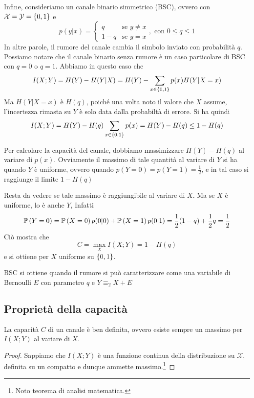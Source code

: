 \begin{example}{}
  Infine, consideriamo un canale binario simmetrico (BSC), ovvero con \(\mathcal{X} = \mathcal{Y} = \set{0,1}\) e 
  \[p(y|x) = \begin{cases}
    q & \text{se } y\neq x \\
    1-q & \text{se } y = x
  \end{cases}, \text{ con } 0\leq q \leq 1\]
  In altre parole, il rumore del canale cambia il simbolo inviato con probabilità \(q\).
  Possiamo notare che il canale binario senza rumore è un caso particolare di BSC con \(q=0\) o \(q=1\).
  Abbiamo in questo caso che
  \[I(X;Y) = H(Y) - H(Y|X) = H(Y) - \sum_{x\in\set{0,1}} p(x) H(Y|X=x)\]
  Ma \(H(Y|X=x)\) è \(H(q)\), poiché una volta noto il valore che \(X\) assume, l'incertezza rimasta su \(Y\) è solo data dalla probabiltà di errore. Si ha quindi
  \[ I(X;Y)=H(Y)-H(q)\sum_{x\in\set{0,1}} p(x) = H(Y) - H(q)\leq 1- H(q)\]

  Per calcolare la capacità del canale, dobbiamo massimizzare \(H(Y)-H(q)\) al variare di \(p(x)\).
  Ovviamente il massimo di tale quantità al variare di \(Y\) si ha quando \(Y\) è uniforme, ovvero quando \(p(Y=0) = p(Y=1) = \frac{1}{2}\), e in tal caso si raggiunge il limite \(1-H(q)\)

  Resta da vedere se tale massimo è raggiungibile al variare di \(X\).
  Ma se \(X\) è uniforme, lo è anche \(Y\), Infatti
  \[\Prob[Y=0] = \Prob[X=0]p(0|0) + \Prob[X=1]p(0|1) = \frac{1}{2}(1-q) +\frac{1}{2}q = \frac{1}{2}\]
  Ciò mostra che
  \[C = \max_{X} I(X;Y) = 1 - H(q)\]
  e si ottiene per \(X\) uniforme su \(\set{0,1}\).

  \begin{observation}{}
    BSC si ottiene quando il rumore si può caratterizzare come una variabile di Bernoulli \(E\) con parametro \(q\) e \(Y \equiv_{2} X + E\)
  \end{observation}
\end{example}

\subsection{Proprietà della capacità}

\begin{proposition}{}
  La capacità \(C\) di un canale è ben definita, ovvero esiste sempre un massimo per \(I(X;Y)\) al variare di \(X\).
\end{proposition}

\begin{proof}
  Sappiamo che \(I(X;Y)\) è una funzione continua della distribuzione su \(\mathcal{X}\), definita su un compatto e dunque ammette massimo.\footnote{Noto teorema di analisi matematica.}
\end{proof}

